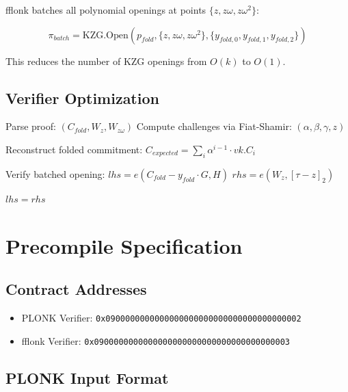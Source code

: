 \documentclass[11pt,a4paper]{article}
\theoremstyle{definition}
\begin{document}
fflonk batches all polynomial openings at points $\{z, z\omega, z\omega^2\}$:

\begin{equation}
\pi_{batch} = \text{KZG.Open}(p_{fold}, \{z, z\omega, z\omega^2\}, \{y_{fold,0}, y_{fold,1}, y_{fold,2}\})
\end{equation}

This reduces the number of KZG openings from $O(k)$ to $O(1)$.

\subsection{Verifier Optimization}

\begin{algorithm}
\caption{fflonk Verification}
\begin{algorithmic}[1]
    \State Parse proof: $(C_{fold}, W_z, W_{z\omega})$
    \State Compute challenges via Fiat-Shamir: $(\alpha, \beta, \gamma, z)$

    \State Reconstruct folded commitment:
    \State $C_{expected} = \sum_{i} \alpha^{i-1} \cdot vk.C_i$

    \State Verify batched opening:
    \State $lhs = e(C_{fold} - y_{fold} \cdot G, H)$
    \State $rhs = e(W_z, [\tau - z]_2)$

    \State \Return $lhs = rhs$
\EndFunction
\end{algorithmic}
\end{algorithm}

\section{Precompile Specification}

\subsection{Contract Addresses}

\begin{itemize}
    \item PLONK Verifier: \texttt{0x0900000000000000000000000000000000000002}
    \item fflonk Verifier: \texttt{0x0900000000000000000000000000000000000003}
\end{itemize}

\subsection{PLONK Input Format}
\end{document}
